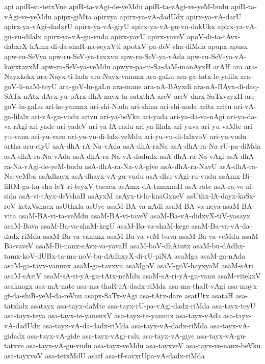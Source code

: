 {api
apiR-su-tetxVne
apiR-ta-vAgi-de-yeMdu
apiR-ta-vAgi-ve-yeM-budu
apiR-ta-vAgi-ve-yeMdu
apipx-giMta
apirxya
apirx-ya-vA-dadUdx
apirx-ya-vA-darU
apirx-ya-vAgi-dadxrU
apirx-ya-vA-giyU
apirx-ya-vA-gu-vu-dakUkx
apirx-ya-vA-gu-vu-dilalx
apirx-ya-vA-gu-vudo
apirx-yavU
apirx-yaveV
apoV-di-ta-tAvx-dabxrX-hAmx-di-da-shaR-na-seyxVti
apotxV-pa-deV-sha-diMda
apupx
apusx
apw-ru-SeVya
apw-ru-SeV-ya-tavxvu
apw-ru-SeV-ya-vAda
apw-ru-SeV-ya-vA-kayxtavxM
apw-ru-SeV-ya-veMdu
apwyx-pa-ni-Sa-daM-manAyxH
arAH
ara
ara-Nayxkekx
ara-Nayx-ti-lada
ara-Nayx-vanunx
ara-gaLu
ara-ga-tatx-le-yalilx
ara-goV-li-naM-teyU
ara-goV-lu-gaLu
ara-mane
ara-nA-BAyxdi
ara-nA-BAyx-di-daq-SATx-nAtx-dAvx-yu-pArx-dhA-nayx-ta-satxthA
areV
areV-darx-SaTxvayxH
are-goV-lu-gaLu
ari-ke-yanunx
ari-shi-Nada
ari-shina
ari-shi-nada
arita
aritu
ari-vA-ga-lilalx
ari-vA-gu-vudu
arivu
ari-ya-beVku
ari-yada
ari-ya-da-va-nAgi
ari-ya-da-va-rAgi
ari-yade
ari-yadeV
ari-ya-lA-radu
ari-ya-lilalx
ari-yuva
ari-yu-vaMte
ari-yu-vanu
ari-yu-varo
ari-yu-vu-di-lalx-veMdu
ari-yu-vu-di-lalxvoV
ari-yu-vudu
artha
aru-ciyU
asA-dhA-rA-Na-vAda
asA-dhA-raNa
asA-dhA-ra-Na-rU-pa-diMda
asA-dhA-ra-Na-vAda
asA-dhA-ra-Na-vA-dadudx
asA-dhA-ra-Na-vAgi
asA-dhA-ra-Na-vAgi-de-yeM-budu
asA-dhA-ra-Na-vA-give
asA-dhA-ra-NavU
asA-dhA-ra-Na-veMba
asAdhayx
asA-dhayx-vA-gu-vudu
asA-dhu-vAgi-ru-vudu
asAmx-Bi-liRM-ga-ku-sha-leY-ri-teyxV-tacacx
asAmx-dA-tamxnaH
asA-rate
asA-ra-ve-ni-sida
asA-vi-tAyx-deVshaH
asAyxM
asAyx-ti-la-knaGxneV
asUthx-lA-dayx-kaSx-roV-ketxVshacx
asUthxla
asUye
asaM-BA-va-nAdi
asaM-BA-va-neya
asaM-BA-vita
asaM-BA-vi-ta-veMdu
asaM-BA-vi-taveV
asaM-Ba-vA-didxvX-tiV-yasayx
asaM-Bava
asaM-Ba-va-shaM-kegU
asaM-Ba-va-shaM-kege
asaM-Ba-va-vA-da-dadx-riMda
asaM-Ba-va-vanunx
asaM-Ba-va-veM-buva
asaM-Ba-va-veMdu
asaM-Ba-vaveV
asaM-Bi-nanx-sAvx-va-yavaH
asaM-boV-dhAtutx
asaM-bu-dAdhx-tamx-koV-dUBx-ta-ma-noV-bu-dAdhxyX-di-rU-piNA
asaMga
asaM-ga-nAda
asaM-ga-tavx-vanunx
asaM-ga-tavxvu
asaMgoV
asaM-goV-hayxyaM
asaM-sAri
asaM-sAriV
asaM-sA-ri-yA-gu-tAtx-neMdu
asaM-sA-ri-yA-gu-vanu
asaM-vitekxV
asaknagx
asa-mA-nate
asa-ma-thaR-rA-dadx-riMda
asa-ma-thaR-vAgi
asa-mayx-gf-da-shiR-yeM-da-reVnu
asapx-SaTx-vAgi
asa-tAtx-dare
asatUtx
asataH
asa-tatxlalx
asatayx
asa-tayx-daMte
asa-tayx-rU-pa-vAgi-dadx-riMda
asa-tayx-teyU
asa-tayx-teya
asa-tayx-te-yanenxV
asa-tayx-te-yanunx
asa-tayx-vAda
asa-tayx-vA-dadUdx
asa-tayx-vA-da-dadx-riMda
asa-tayx-vA-dadx-riMda
asa-tayx-vA-gidadx
asa-tayx-vA-gide
asa-tayx-vAgi-ralu
asa-tayx-vA-giye
asa-tayx-vA-gu-tatxve
asa-tayx-vA-gu-vudu
asa-tayx-veMdu
asa-tayxveV
asa-tayx-ve-nanx-beVku
asa-tayxvoV
asa-tetxMdU
asatf
asa-tf-savxrUpa-vA-dadx-riMda
}
